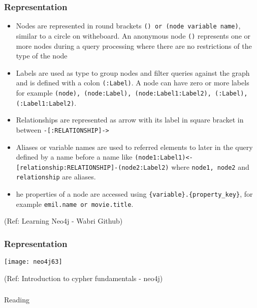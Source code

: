 \begin{frame}[fragile]\frametitle{Representation}


\begin{itemize}
\item Nodes are represented in round brackets \lstinline|() or (node variable name)|, similar to a circle on witheboard. An anonymous node \lstinline|()| represents one or more nodes during a query processing where there are no restrictions of the type of the node
\item Labels are used as type to group nodes and filter queries against the graph and is defined with a colon \lstinline|(:Label)|. A node can have zero or more labels for example \lstinline|(node), (node:Label), (node:Label1:Label2), (:Label), (:Label1:Label2)|.
\item Relationships are represented as arrow with its label in square bracket in between \lstinline|-[:RELATIONSHIP]->|
\item Aliases or variable names are  used to referred elements to later in the query defined by a name before a name like \lstinline|(node1:Label1)<-[relationship:RELATIONSHIP]-(node2:Label2)| where \lstinline|node1, node2| and \lstinline|relationship| are aliases.
\item he properties of a node are accessed using \lstinline|{variable}.{property_key}|, for example \lstinline|emil.name or movie.title|.
\end{itemize}

{\tiny (Ref: Learning Neo4j - Wabri Github)}


\end{frame}

\begin{frame}[fragile]\frametitle{Representation}


\begin{center}
\texttt{[image: neo4j63]}
\end{center}	  


{\tiny (Ref: Introduction to cypher fundamentals  - neo4j)}

\end{frame}


\begin{frame}[fragile]\frametitle{}
\begin{center}
{\Large Reading}
\end{center}
\end{frame}


